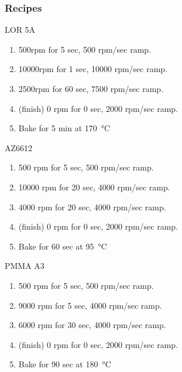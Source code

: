 \documentclass[12pt,a4paper]{report}
\begin{document}
\subsubsection{Recipes}
\begin{description}
\item {LOR 5A}
  \begin{enumerate}
  \item 500rpm for 5 sec, 500 rpm/sec ramp.
  \item 10000rpm for 1 sec, 10000 rpm/sec ramp.
  \item 2500rpm for 60 sec, 7500 rpm/sec ramp.
  \item (finish) 0 rpm for 0 sec, 2000 rpm/sec ramp.
  \item Bake for 5 min at \SI{170}{\celsius}
  \end{enumerate}
\item {AZ6612}
  \begin{enumerate}
  \item 500 rpm for 5 sec, 500 rpm/sec ramp.
  \item 10000 rpm for 20 sec, 4000 rpm/sec ramp.
  \item 4000 rpm for 20 sec, 4000 rpm/sec ramp.
  \item (finish) 0 rpm for 0 sec, 2000 rpm/sec ramp.
  \item Bake for 60 sec at \SI{95}{\celsius}
  \end{enumerate}
\item {PMMA A3}
  \begin{enumerate}
  \item 500 rpm for 5 sec, 500 rpm/sec ramp.
  \item 9000 rpm for 5 sec, 4000 rpm/sec ramp.
  \item 6000 rpm for 30 sec, 4000 rpm/sec ramp.
  \item (finish) 0 rpm for 0 sec, 2000 rpm/sec ramp.
  \item Bake for 90 sec at \SI{180}{\celsius}
  \end{enumerate}
\end{description}
\end{document}
